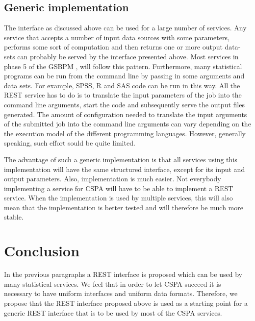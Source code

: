 \documentclass[a4paper]{article}
\begin{document}
\subsection{Generic implementation}
The interface as discussed above can be used for a large number of services. Any
service that accepts a number of input data sources with some parameters,
performs some sort of computation and then returns one or more output data-sets
can probably be served by the interface presented above. Most services in phase
5 of the GSBPM \citep{gsbpm2013}, will follow this pattern.  Furthermore, many
statistical programs can be run from the command line by passing in some
arguments and data sets. For example, SPSS, R and SAS code can be run in this
way. All the REST service has to do is to translate the input parameters of the
job into the command line arguments, start the code and subsequently serve the
output files generated.  The amount of configuration needed to translate the
input arguments of the submitted job into the command line arguments can vary
depending on the the execution model of the different programming languages.
However, generally speaking, such effort sould be quite limited. 

The advantage of such a generic implementation is that all services using this
implementation will have the same structured interface, except for its input and
output parameters. Also, implementation is much easier. Not everybody
implementing a service for CSPA will have to be able to implement a REST
service. When the implementation is used by multiple services, this will also
mean that the implementation is better tested and will therefore be much more
stable. 




\section{Conclusion}

In the previous paragraphs a REST interface is proposed which can be used by
many statistical services. We feel that in order to let CSPA succeed it is
necessary to have uniform interfaces and uniform data formats. Therefore, we
propose that the REST interface proposed above is used as a starting point for a
generic REST interface that is to be used by most of the CSPA services. 



\end{document}
